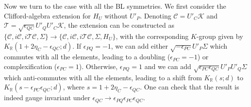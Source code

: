 \documentclass{tADP2e}
\theoremstyle{plain}
\theoremstyle{plain}
\theoremstyle{definition}
\begin{document}
\begin{appendices}
Now we turn to the case with all the BL symmetries. We first consider the Clifford-algebra extension for $H_U$ without $U'_P$. Denoting $\mathcal{C}=U'_C\mathcal{K}$ and $\mathcal{T}=\sqrt{\epsilon_{QC}}U'_QU'_C\mathcal{K}$, the extension can be constructed as $\{\mathcal{C},i\mathcal{C},i\mathcal{T}\mathcal{C},\Sigma\}\to\{\mathcal{C},i\mathcal{C},i\mathcal{T}\mathcal{C},\Sigma,H_U\}$, with the corresponding $K$-group given by $K_{\mathbb{R}}(1+2\eta_C-\epsilon_{QC};d)$. If $\epsilon_{PQ}=-1$, we can add either $\sqrt{-\epsilon_{PC}}U'_P\Sigma$ which commutes with all the elements, leading to a doubling ($\epsilon_{PC}=-1$) or complexification ($\epsilon_{PC}=1$). Otherwise, $\epsilon_{PQ}=1$ and we can add $\sqrt{\epsilon_{PC}\epsilon_{QC}}U'_PU'_Q\Sigma$ which anti-commutes with all the elements, leading to a shift from $K_{\mathbb{R}}(s;d)$ to $K_{\mathbb{R}}(s-\epsilon_{PC}\epsilon_{QC};d)$, where $s=1+2\eta_C-\epsilon_{QC}$. One can check that the result is indeed gauge invariant under $\epsilon_{QC}\to\epsilon_{PQ}\epsilon_{PC}\epsilon_{QC}$.

\end{appendices}



\end{document}
